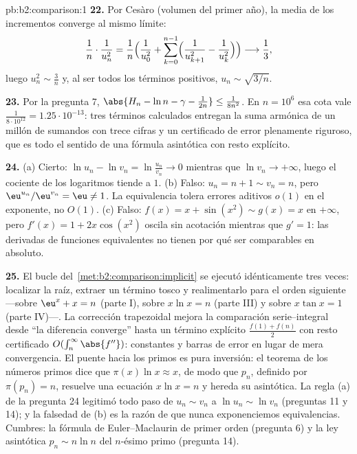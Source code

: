 \begin{solution}{pb:b2:comparison:1}
\textbf{22.} Por Cesàro (volumen del primer año), la media de los
incrementos converge al mismo límite:
\[
\frac{1}{n}\cdot\frac{1}{u_n^2}
= \frac1n\Bigl(\frac1{u_0^2} + \sum_{k=0}^{n-1}
\Bigl(\frac1{u_{k+1}^2} - \frac1{u_k^2}\Bigr)\Bigr)
\longrightarrow \frac13 ,
\]
luego $u_n^2 \sim \frac3n$ y, al ser todos los términos
positivos, $u_n \sim \sqrt{3/n}$.

\textbf{23.} Por la pregunta 7, $\abs{H_n - \ln n - \gamma -
\frac1{2n}} \leq \frac1{8n^2}$. En $n = 10^6$ esa cota vale
$\frac{1}{8\cdot10^{12}} = 1.25\cdot10^{-13}$: tres términos
calculados entregan la suma armónica de un millón de sumandos con
trece cifras y un certificado de error plenamente riguroso, que
es todo el sentido de una fórmula asintótica con resto explícito.

\textbf{24.} (a) Cierto: $\ln u_n - \ln v_n = \ln\frac{u_n}{v_n}
\to 0$ mientras que $\ln v_n \to +\infty$, luego el cociente de
los logaritmos tiende a $1$. (b) Falso: $u_n = n + 1 \sim v_n =
n$, pero $\eu^{u_n}/\eu^{v_n} = \eu \neq 1$. La equivalencia
tolera errores aditivos $o(1)$ en el exponente, no $O(1)$. (c)
Falso: $f(x) = x + \sin(x^2) \sim g(x) = x$ en $+\infty$, pero
$f'(x) = 1 + 2x\cos(x^2)$ oscila sin acotación mientras que $g' =
1$: las derivadas de funciones equivalentes no tienen por qué ser
comparables en absoluto.

\textbf{25.} El bucle del~\cref{met:b2:comparison:implicit} se
ejecutó idénticamente tres veces: localizar la raíz, extraer un
término tosco y realimentarlo para el orden siguiente ---sobre
$\eu^x + x = n$ (parte I), sobre $x\ln x = n$ (parte III) y sobre
$x\tan x = 1$ (parte IV)---. La corrección trapezoidal mejora la
comparación serie--integral desde ``la diferencia converge'' hasta
un término explícito $\frac{f(1) + f(n)}2$ con resto certificado
$O(\int_n^\infty \abs{f''})$: constantes y barras de error en
lugar de mera convergencia. El puente hacia los primos es pura
inversión: el teorema de los números primos dice que $\pi(x)\ln x
\approx x$, de modo que $p_n$, definido por $\pi(p_n) = n$,
resuelve una ecuación $x\ln x = n$ y hereda su asintótica. La
regla (a) de la pregunta 24 legitimó todo paso de $u_n \sim v_n$
a $\ln u_n \sim \ln v_n$ (preguntas 11 y 14); y la falsedad de
(b) es la razón de que nunca exponenciemos equivalencias.
Cumbres: la fórmula de Euler--Maclaurin de primer orden (pregunta
6) y la ley asintótica $p_n \sim n\ln n$ del $n$-ésimo primo
(pregunta 14).
\end{solution}
